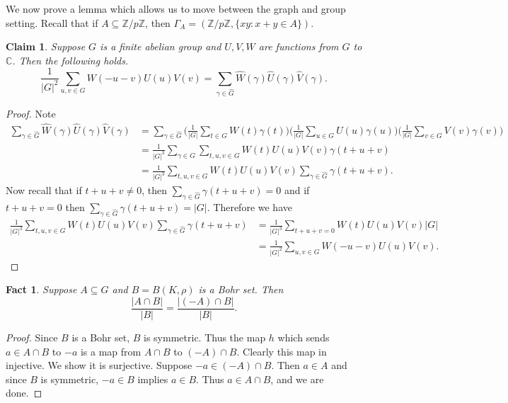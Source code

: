 \documentclass[11pt]{article}
\newtheorem{claim}{Claim}
\newtheorem{fact}{Fact}
\theoremstyle{definition}
\begin{document}
We now prove a lemma which allows us to move between the graph and group setting.  Recall that if $A\subseteq \mathbb{Z}/p\mathbb{Z}$, then $\Gamma_A=(\mathbb{Z}/p\mathbb{Z},\{xy: x+y\in A\})$. 

\begin{claim}\label{claim}
Suppose $G$ is a finite abelian group and $U,V,W$ are functions from $G$ to $\mathbb{C}$.  Then the following holds. 
$$
\frac{1}{|G|^2}\sum_{u,v\in G}W(-u-v)U(u)V(v)=\sum_{\gamma\in \widehat{G}}\widehat{W}(\gamma)\widehat{U}(\gamma)\widehat{V}(\gamma).
$$
\end{claim}
\begin{proof}
Note 
\begin{align*}
\sum_{\gamma\in \widehat{G}}\widehat{W}(\gamma)\widehat{U}(\gamma)\widehat{V}(\gamma)&=\sum_{\gamma \in \widehat{G}}\Big(\frac{1}{|G|}\sum_{t\in G}W(t)\gamma(t)\Big)\Big(\frac{1}{|G|}\sum_{u\in G}U(u)\gamma(u)\Big)\Big(\frac{1}{|G|}\sum_{v\in G}V(v)\gamma(v)\Big)\\
&=\frac{1}{|G|^3}\sum_{\gamma \in \widehat{G}}\sum_{t,u,v\in G}W(t)U(u)V(v)\gamma(t+u+v)\\
&=\frac{1}{|G|^3}\sum_{t,u,v\in G}W(t)U(u)V(v)\sum_{\gamma \in \widehat{G}}\gamma(t+u+v).
\end{align*}
Now recall that if $t+u+v\neq 0$, then $\sum_{\gamma \in \widehat{G}}\gamma(t+u+v) =0$ and if $t+u+v=0$ then $\sum_{\gamma \in \widehat{G}}\gamma(t+u+v)=|G|$.  Therefore we have
\begin{align*}
\frac{1}{|G|^3}\sum_{t,u,v\in G}W(t)U(u)V(v)\sum_{\gamma \in \widehat{G}}\gamma(t+u+v)&=\frac{1}{|G|^3}\sum_{ t+u+v=0}W(t)U(u)V(v)|G|\\
&=\frac{1}{|G|^2}\sum_{u,v\in G}W(-u-v)U(u)V(v).
\end{align*}
\end{proof}

\begin{fact}
Suppose $A\subseteq G$ and $B=B(K,\rho)$ is a Bohr set.  Then 
$$
\frac{|A\cap B|}{|B|}=\frac{|(-A)\cap B|}{|B|}.
$$
\end{fact}
\begin{proof}
Since $B$ is a Bohr set, $B$ is symmetric.  Thus the map $h$ which sends $a\in A\cap B$ to $-a$ is a map from $A\cap B$ to $(-A)\cap B$.  Clearly this map in injective.  We show it is surjective.  Suppose $-a\in (-A)\cap B$. Then $a\in A$ and since $B$ is symmetric, $-a\in B$ implies $a\in B$.   Thus $a\in A\cap B$, and we are done.
\end{proof}
\end{document}
